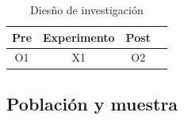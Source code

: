 \documentclass[12pt,a4paper]{article}
\begin{document}
\begin{table}[ht!]
	\caption{Diesño de investigación}
	\label{figg}
	\centering
	\begin{tabular}{cccc}
		\toprule
		Pre & Experimento & Post \\
		\midrule
		O1  & X1          & O2    \\
		\bottomrule
	\end{tabular}
\end{table}


%
%



\subsection{Población y muestra}
\end{document}
